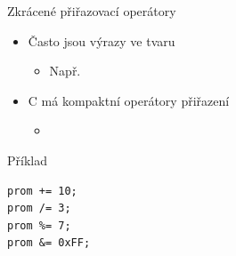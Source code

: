 \begin{frame}[fragile]{Zkrácené přiřazovací operátory}

  \begin{itemize}
    \item Často jsou výrazy ve tvaru 
    \begin{itemize}
      \item Např.\ 
    \end{itemize}

    \pause

    \item C má kompaktní operátory přiřazení
    \begin{itemize}
      \item {}
    \end{itemize}

  \end{itemize}

  \begin{block}{Příklad}
  \begin{lstlisting}
prom += 10;
prom /= 3;
prom %= 7;
prom &= 0xFF;
  \end{lstlisting}
  \end{block}

\end{frame}

